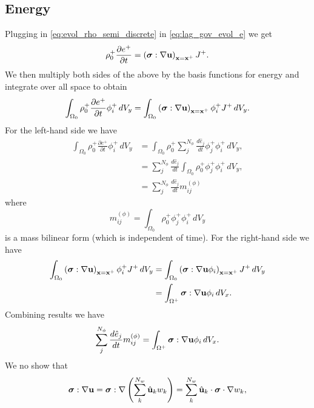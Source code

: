 \documentclass[11pt]{report}
\begin{document}
\subsection{Energy}
Plugging in \cref{eq:evol_rho_semi_discrete} in \cref{eq:lag_gov_evol_e} we get
\begin{equation}
    \rho^+_0 \frac{\partial e^+}{\partial t} = \left ( \bm \sigma : \nabla \mathbf{u} \right )_{\mathbf{x} = \mathbf{x}^+} J^+.
\end{equation}
We then multiply both sides of the above by the basis functions for energy and integrate over all space to obtain
\begin{equation}
    \int_{\Omega_0} \rho^+_0 \frac{\partial e^+}{\partial t} \phi_i^+ \, dV_y = \int_{\Omega_0} \left ( \bm \sigma : \nabla \mathbf{u} \right )_{\mathbf{x} = \mathbf{x}^+} \phi_i^+ J^+ \, dV_y.
\end{equation}
For the left-hand side we have
\begin{align}
    \int_{\Omega_0} \rho^+_0 \frac{\partial e^+}{\partial t} \phi_i^+ \, dV_y &= \int_{\Omega_0} \rho^+_0 \sum_j^{N_\phi} \frac{d \hat{e}_j}{dt} \phi_j^+ \phi_i^+ \, dV_y , \nonumber \\
    &= \sum_j^{N_\phi} \frac{d \hat{e}_j}{dt} \int_{\Omega_0} \rho^+_0 \phi_j^+ \phi_i^+ \, dV_y , \nonumber \\
    &= \sum_j^{N_\phi} \frac{d \hat{e}_j}{dt} m_{ij}^{(\phi)}
\end{align}
where
\begin{equation}
    m_{ij}^{(\phi)} = \int_{\Omega_0} \rho^+_0 \phi_j^+ \phi_i^+ \, dV_y
\end{equation}
is a mass bilinear form (which is independent of time). For the right-hand side we have
\begin{align}
    \int_{\Omega_0} \left ( \bm \sigma : \nabla \mathbf{u} \right )_{\mathbf{x} = \mathbf{x}^+} \phi_i^+ J^+ \, dV_y &= \int_{\Omega_0} \left ( \bm \sigma : \nabla \mathbf{u} \phi_i \right )_{\mathbf{x} = \mathbf{x}^+} J^+ \, dV_y \nonumber \\
    &= \int_{\Omega^+} \bm \sigma : \nabla \mathbf{u} \phi_i \, dV_x. 
\end{align}
Combining results we have
\begin{equation}
    \sum_j^{N_\phi} \frac{d \hat{e}_j}{dt} m_{ij}^{(\phi)} = \int_{\Omega^+} \bm \sigma : \nabla \mathbf{u} \phi_i \, dV_x.
\end{equation}
We no show that
\begin{equation}
    \bm \sigma : \nabla \mathbf{u} = \bm \sigma : \nabla \left ( \sum_k^{N_w} \hat{\mathbf{u}}_k w_k \right ) = \sum_k^{N_w} \hat{\mathbf{u}}_k \cdot \bm \sigma \cdot \nabla w_k,
\end{equation}
\end{document}
